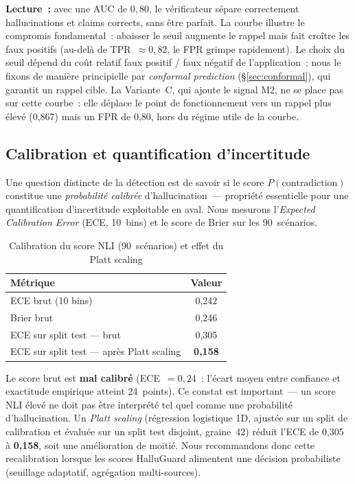 \documentclass[12pt,a4paper]{article}
\begin{document}
\textbf{Lecture~:} avec une AUC de $0{,}80$, le vérificateur sépare correctement hallucinations et claims corrects, sans être parfait. La courbe illustre le compromis fondamental~: abaisser le seuil augmente le rappel mais fait croître les faux positifs (au-delà de TPR~$\approx0{,}82$, le FPR grimpe rapidement). Le choix du seuil dépend du coût relatif faux positif / faux négatif de l'application~; nous le fixons de manière principielle par \emph{conformal prediction} (§\ref{sec:conformal}), qui garantit un rappel cible. La Variante~C, qui ajoute le signal M2, ne se place pas sur cette courbe~: elle déplace le point de fonctionnement vers un rappel plus élevé (0,867) mais un FPR de 0,80, hors du régime utile de la courbe.

\subsection{Calibration et quantification d'incertitude}
\label{sec:calibration}

Une question distincte de la détection est de savoir si le score $P(\text{contradiction})$ constitue une \emph{probabilité calibrée} d'hallucination~--- propriété essentielle pour une quantification d'incertitude exploitable en aval. Nous mesurons l'\textit{Expected Calibration Error} (ECE, 10~bins) \cite{guo2017calibration} et le score de Brier sur les 90~scénarios.

\begin{table}[H]
\centering
\caption{Calibration du score NLI (90~scénarios) et effet du Platt scaling}
\label{tab:calibration}
\renewcommand{\arraystretch}{1.2}
\begin{tabular}{lc}
\toprule
\textbf{Métrique} & \textbf{Valeur} \\
\midrule
ECE brut (10 bins) & 0,242 \\
Brier brut & 0,246 \\
ECE sur split test --- brut & 0,305 \\
ECE sur split test --- après Platt scaling & \textbf{0,158} \\
\bottomrule
\end{tabular}
\end{table}

Le score brut est \textbf{mal calibré} (ECE~$=0{,}24$~: l'écart moyen entre confiance et exactitude empirique atteint 24~points). Ce constat est important~--- un score NLI élevé ne doit pas être interprété tel quel comme une probabilité d'hallucination. Un \emph{Platt scaling} (régression logistique 1D, ajustée sur un split de calibration et évaluée sur un split test disjoint, graine~42) réduit l'ECE de 0,305 à \textbf{0,158}, soit une amélioration de moitié. Nous recommandons donc cette recalibration lorsque les scores HalluGuard alimentent une décision probabiliste (seuillage adaptatif, agrégation multi-sources).
\end{document}
